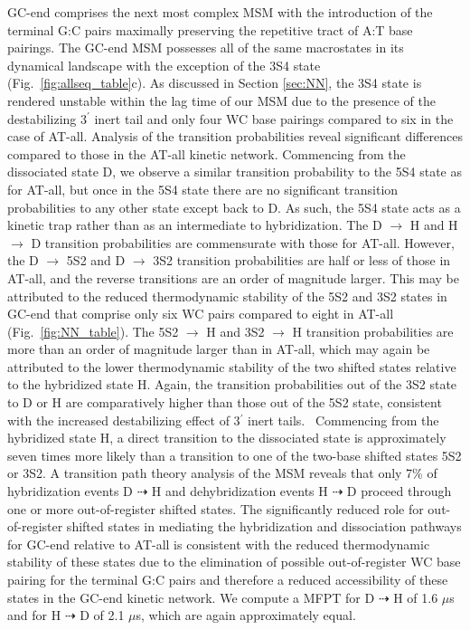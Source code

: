 \documentclass[journal=jpcbfk,manuscript=article]{achemso}
\begin{document}
GC-end comprises the next most complex MSM with the introduction of the terminal G:C pairs maximally preserving the repetitive tract of A:T base pairings. The GC-end MSM possesses all of the same macrostates in its dynamical landscape with the exception of the 3S4 state (Fig.~\ref{fig:allseq_table}c). As discussed in Section \ref{sec:NN}, the 3S4 state is rendered unstable within the lag time of our MSM due to the presence of the destabilizing 3$^\prime$ inert tail and only four WC base pairings compared to six in the case of AT-all. Analysis of the transition probabilities reveal significant differences compared to those in the AT-all kinetic network. Commencing from the dissociated state D, we observe a similar transition probability to the 5S4 state as for AT-all, but once in the 5S4 state there are no significant transition probabilities to any other state except back to D. As such, the 5S4 state acts as a kinetic trap rather than as an intermediate to hybridization. The D $\rightarrow$ H and H $\rightarrow$ D transition probabilities are commensurate with those for AT-all. However, the D $\rightarrow$ 5S2 and D $\rightarrow$ 3S2 transition probabilities are half or less of those in AT-all, and the reverse transitions are an order of magnitude larger. This may be attributed to the reduced thermodynamic stability of the 5S2 and 3S2 states in GC-end that comprise only six WC pairs compared to eight in AT-all (Fig.~\ref{fig:NN_table}). The 5S2 $\rightarrow$ H and 3S2 $\rightarrow$ H transition probabilities are more than an order of magnitude larger than in AT-all, which may again be attributed to the lower thermodynamic stability of the two shifted states relative to the hybridized state H. Again, the transition probabilities out of the 3S2 state to D or H are comparatively higher than those out of the 5S2 state, consistent with the increased destabilizing effect of 3$^\prime$ inert tails.~\citep{Doktycz1990ThermodynamicATGC, Dickman2012ThermodynamicDNAs, Michele2014EHybridization} Commencing from the hybridized state H, a direct transition to the dissociated state is approximately seven times more likely than a transition to one of the two-base shifted states 5S2 or 3S2. A transition path theory analysis of the MSM reveals that only 7\% of hybridization events D $\dashrightarrow$ H and dehybridization events H $\dashrightarrow$ D proceed through one or more out-of-register shifted states. The significantly reduced role for out-of-register shifted states in mediating the hybridization and dissociation pathways for GC-end relative to AT-all is consistent with the reduced thermodynamic stability of these states due to the elimination of possible out-of-register WC base pairing for the terminal G:C pairs and therefore a reduced accessibility of these states in the GC-end kinetic network. We compute a MFPT for D $\dashrightarrow$ H of 1.6 $\mu$s and for H $\dashrightarrow$ D of 2.1 $\mu$s, which are again approximately equal.
\end{document}
